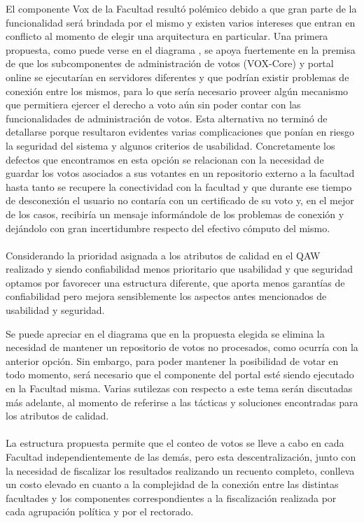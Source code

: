 El componente Vox de la Facultad resultó polémico debido a que gran parte de la funcionalidad será brindada por el mismo y existen varios intereses que entran en conflicto al momento de elegir una arquitectura en particular. Una primera propuesta, como puede verse en el diagrama %
, se apoya fuertemente en la premisa de que los subcomponentes de administración de votos (VOX-Core) y portal online se ejecutarían en servidores diferentes y que podrían existir problemas de conexión entre los mismos, para lo que sería necesario proveer algún mecanismo que permitiera ejercer el derecho a voto aún sin poder contar con las funcionalidades de administración de votos. Esta alternativa no terminó de detallarse porque resultaron evidentes varias complicaciones que ponían en riesgo la seguridad del sistema y algunos criterios de usabilidad. Concretamente los defectos que encontramos en esta opción se relacionan con la necesidad de guardar los votos asociados a sus votantes en un repositorio externo a la facultad hasta tanto se recupere la conectividad con la facultad y que durante ese tiempo de desconexión el usuario no contaría con un certificado de su voto y, en el mejor de los casos, recibiría un mensaje informándole de los problemas de conexión y dejándolo con gran incertidumbre respecto del efectivo cómputo del mismo.
\\
\\
Considerando la prioridad asignada a los atributos de calidad en el QAW realizado y siendo confiabilidad menos prioritario que usabilidad y que seguridad optamos por favorecer una estructura diferente, que aporta menos garantías de confiabilidad pero mejora sensiblemente los aspectos antes mencionados de usabilidad y seguridad.

Se puede apreciar en el diagrama %
que en la propuesta elegida se elimina la necesidad de mantener un repositorio de votos no procesados, como ocurría con la anterior opción. Sin embargo, para poder mantener la posibilidad de votar en todo momento, será necesario que el componente del portal esté siendo ejecutado en la Facultad misma. Varias sutilezas con respecto a este tema serán discutadas más adelante, al momento de referirse a las tácticas y soluciones encontradas para los atributos de calidad.
\\
\\
La estructura propuesta permite que el conteo de votos se lleve a cabo en cada Facultad independientemente de las demás, pero esta descentralización, junto con la necesidad de fiscalizar los resultados realizando un recuento completo, conlleva un costo elevado en cuanto a la complejidad de la conexión entre las distintas facultades y los componentes correspondientes a la fiscalización realizada por cada agrupación política y por el rectorado.

